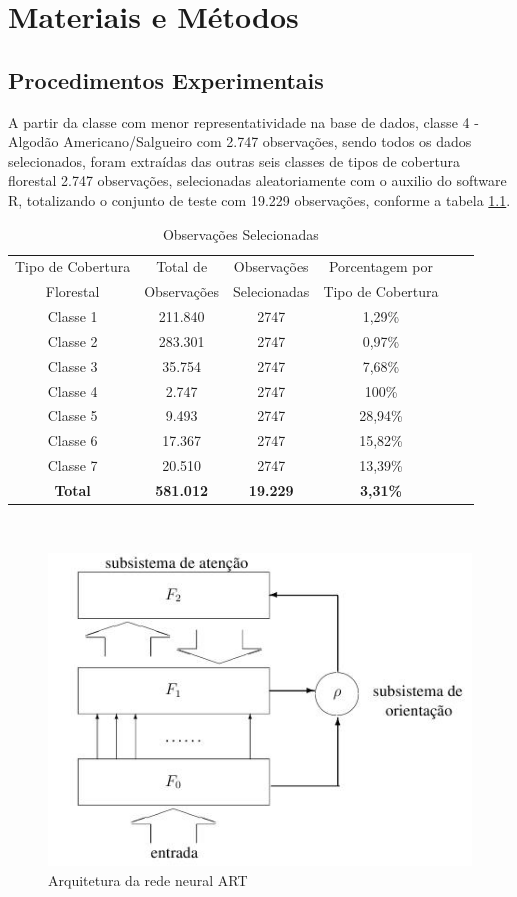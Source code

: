 \chapter{Materiais e Métodos}

\section{Procedimentos Experimentais}
A partir da classe com menor representatividade na base de dados, classe 4 - Algodão Americano/Salgueiro com 2.747 observações, sendo todos os dados selecionados, foram extraídas das outras seis classes de tipos de cobertura florestal 2.747 observações, selecionadas aleatoriamente com o auxilio do software R, totalizando o conjunto de teste com 19.229 observações, conforme a tabela \ref{tb:dados}.

\begin{table}[htbp]
\caption{Observações Selecionadas}
\label{tb:dados}
\centering
\setlength{\tabcolsep}{5pt}
\begin{tabular}{cccccc}
\hline
Tipo de Cobertura  &Total de  &Observações  &Porcentagem por \\
Florestal &Observações &Selecionadas &Tipo de Cobertura \\
\hline
Classe 1 &211.840 &2747 &1,29\% \\
Classe 2 &283.301 &2747 &0,97\% \\
Classe 3 &35.754  &2747 &7,68\% \\
Classe 4 &2.747   &2747 &100\% \\
Classe 5 &9.493   &2747 &28,94\% \\
Classe 6 &17.367  &2747 &15,82\% \\
Classe 7 &20.510  &2747 &13,39\% \\
\hline
\textbf{Total} &\textbf{581.012} &\textbf{19.229} &\textbf{3,31\%} \\
\hline
\end{tabular}
\\
\singlespacing
{}
\end{table}


\begin{figure}[htb]
\centering
\includegraphics[scale=.5]{art}
\caption{Arquitetura da rede neural ART}\label{fig:art}
\end{figure}
